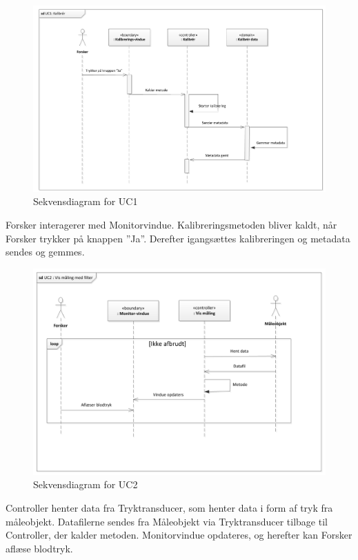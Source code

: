 \begin{figure}[H]
	\centering
	\includegraphics[width=1\textwidth]{Figurer/Snip20151104_31}
	\caption{Sekvensdiagram for UC1}
\end{figure}

Forsker interagerer med Monitorvindue. Kalibreringsmetoden bliver kaldt, når Forsker trykker på knappen ”Ja”. Derefter igangsættes kalibreringen og metadata sendes og gemmes. 

\begin{figure}[H]
	\centering
	\includegraphics[width=1\textwidth]{Figurer/Snip20151104_32}
	\caption{Sekvensdiagram for UC2}
\end{figure}

Controller henter data fra Tryktransducer, som henter data i form af tryk fra måleobjekt. Datafilerne sendes fra Måleobjekt via Tryktransducer tilbage til Controller, der kalder metoden. Monitorvindue opdateres, og herefter kan Forsker aflæse blodtryk. 


